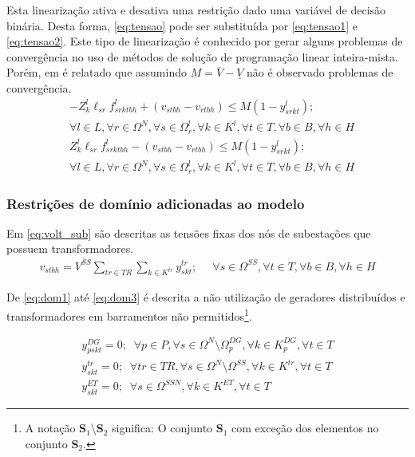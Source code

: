Esta linearização ativa e desativa uma restrição dado uma variável de decisão binária. Desta forma, \eqref{eq:tensao} pode ser substituída por \eqref{eq:tensao1} e \eqref{eq:tensao2}. Este tipo de linearização é conhecido por gerar alguns problemas de convergência no uso de métodos de solução de programação linear inteira-mista. Porém, em  é relatado que assumindo $M = \overline{V} -  \underline{V}$ não é observado problemas de convergência.
\begin{align}
&- Z^l_{k}\ell_{sr}f^l_{srktbh} + (v_{stbh} - v_{rtbh}) \leq  M(1 - y^l_{srkt}); \nonumber\\
&\forall l \in L, \forall r \in \Omega^N, \forall s \in \Omega^{l}_r, \forall k \in K^{l}, \forall t \in T, \forall b \in B, \forall h \in H
 \label{eq:tensao1}\\
&Z^l_{k}\ell_{sr}f^l_{srktbh} - (v_{stbh} - v_{rtbh}) \leq  M(1 - y^l_{srkt}); \nonumber\\
&\forall l \in L, \forall r \in \Omega^N, \forall s \in \Omega^{l}_r, \forall k \in K^{l}, \forall t \in T, \forall b \in B, \forall h \in H
\label{eq:tensao2}
\end{align}

\subsubsection*{Restrições de domínio adicionadas ao modelo}

Em \eqref{eq:volt_sub} são descritas as tensões fixas dos nós de subestações que possuem transformadores.
\begin{align}
v_{stbh} = V^{SS} \sum_{tr \in TR}\sum_{k \in K^{tr}} y^{tr}_{skt} ; \; \;& \forall s \in \Omega^{SS}, \forall t \in T, \forall b \in B, \forall h \in H
\label{eq:volt_sub}
\end{align}

De \eqref{eq:dom1} até \eqref{eq:dom3} é descrita a não utilização de geradores distribuídos e transformadores em barramentos não permitidos\footnote{A notação \textbf{S}$_1\setminus$\textbf{S}$_2$ significa: O conjunto \textbf{S}$_1$ com exceção dos elementos no conjunto \textbf{S}$_2$.}.

\begin{align}
    y^{DG}_{pskt} = 0; \;\; \forall p \in P, \forall s \in \Omega^N \setminus \Omega^{DG}_p , \forall k \in K^{DG}_p, \forall t \in T
\label{eq:dom1}\\
    y^{tr}_{skt} = 0; \;\; \forall tr \in TR,  \forall s \in \Omega^N \setminus \Omega^{SS} , \forall k \in K^{tr}, \forall t \in T
\label{eq:dom2}\\
    y^{ET}_{skt} = 0; \;\; \forall s \in \Omega^{SSN} , \forall k \in K^{ET}, \forall t \in T
\label{eq:dom3}
\end{align}


